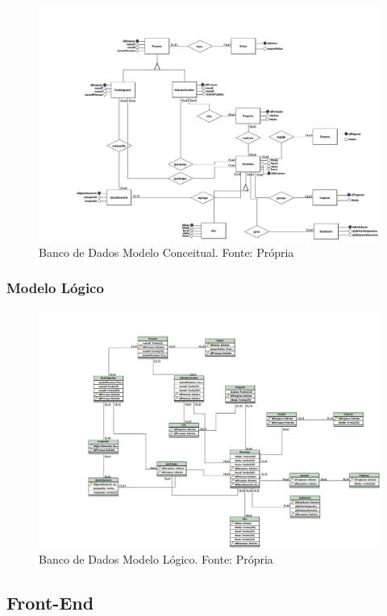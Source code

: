 \begin{figure}[H]
	\centering
	\includegraphics[width=1.0\textwidth]{figuras/bancoDeDados.jpg}
	\caption{Banco de Dados Modelo Conceitual. Fonte: Própria}
	\label{img:banco_conceitual}
\end{figure}

\subsubsection{Modelo Lógico}

\begin{figure}[H]
	\centering
	\includegraphics[width=1.0\textwidth]{figuras/bancoDeDadosLogico.jpg}
	\caption{Banco de Dados Modelo Lógico. Fonte: Própria}
	\label{img:banco_logico}
\end{figure}

\subsection{Front-End}

